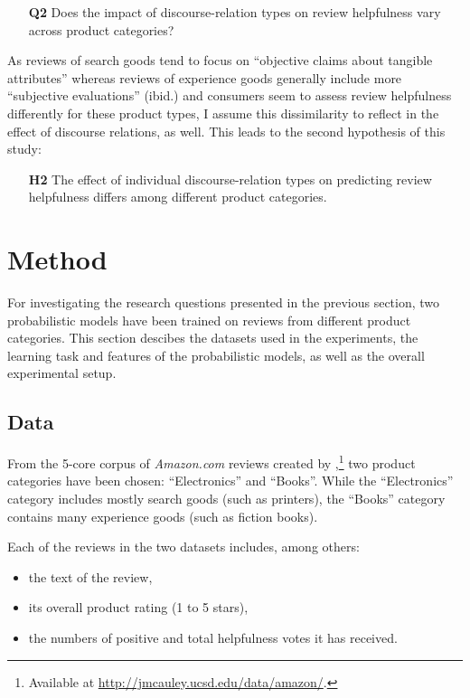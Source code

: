 \documentclass[
    a4paper,%
    12pt,%
    oneside,%
    toc=bibliography,
    final,
]{scrartcl}
\begin{document}
\begin{enumerate}[rightmargin=1cm]
\item[\textbf{Q2}] Does the impact of discourse-relation types on review helpfulness vary across product categories?
\end{enumerate}

As reviews of search goods tend to focus on “objective claims about tangible attributes” \citep[189]{MudambiSchuff2010} whereas reviews of experience goods generally include more “subjective evaluations” (ibid.) and consumers seem to assess review helpfulness differently for these product types, I assume this dissimilarity to reflect in the effect of discourse relations, as well. This leads to the second hypothesis of this study:

\begin{enumerate}[rightmargin=1cm]
\item[\textbf{H2}] The effect of individual discourse-relation types on predicting review helpfulness differs among different product categories.
\end{enumerate}

\section{Method}
\label{sec:method}

For investigating the research questions presented in the previous section, two probabilistic models have been trained on reviews from different product categories. This section descibes the datasets used in the experiments, the learning task and features of the probabilistic models, as well as the overall experimental setup.

\subsection{Data}

From the 5-core corpus of \textit{Amazon.com} reviews created by \citet{HeMcAuley2016},\footnote{Available at \url{http://jmcauley.ucsd.edu/data/amazon/}.} two product categories have been chosen: “Electronics” and “Books”. While the “Electronics” category includes mostly search goods (such as printers), the “Books” category contains many experience goods (such as fiction books).

Each of the reviews in the two datasets includes, among others:

\begin{itemize}
\item the text of the review,
\item its overall product rating (1 to 5 stars),
\item the numbers of positive and total helpfulness votes it has received.
\end{itemize}
\end{document}
